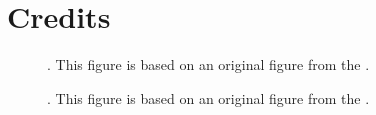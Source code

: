 \FloatBarrier


\label{sec:references-intro}

\section*{Credits}
\label{sec:intro-credits}

\begin{description}
\item[] . This
  figure is based on an original figure from the \citet[Fig. 1,
  p. 4]{ofen-2012a}.
\item[]
    . This figure is based on an original figure from the
    \citet[Fig. 4.3, p. 46]{iea-2008a}.
\end{description}
